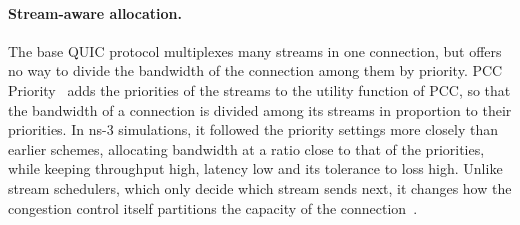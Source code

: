 

\paragraph{Stream-aware allocation.} The base QUIC protocol multiplexes many streams in
one connection, but offers no way to divide the bandwidth of the connection among them
by priority. PCC Priority~\cite{chen2023pccpriority} adds the priorities of the streams
to the utility function of PCC, so that the bandwidth of a connection is divided among
its streams in proportion to their priorities. In ns-3 simulations, it followed the priority
settings more closely than earlier schemes, allocating bandwidth at a ratio close to
that of the priorities, while keeping throughput high, latency low and its tolerance to
loss high. Unlike stream schedulers, which only decide which
stream sends next, it changes how the congestion control itself partitions the capacity
of the connection~\cite{rizvi2026cats}.




